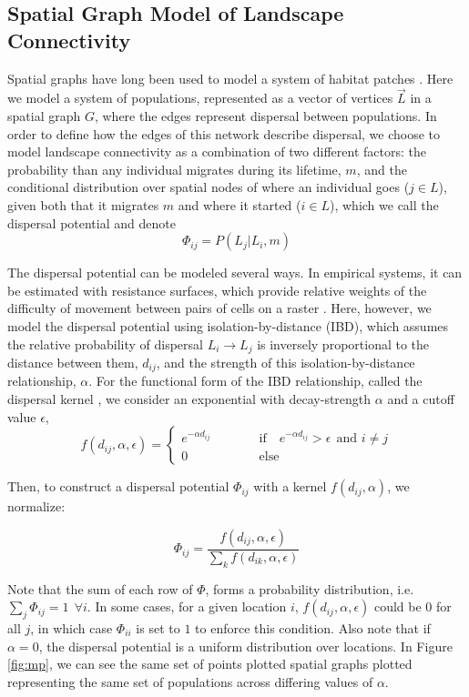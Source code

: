 \documentclass[]{article}
\begin{document}
\subsection{Spatial Graph Model of Landscape Connectivity}
Spatial graphs have long been used to model a system of habitat patches
\cite{dale_graphs_2010, minor_graph-theory_2008,
urban_landscape_2001}. 
Here we model a system of populations, represented as a vector of
vertices $\vec{L}$ in a spatial graph $G$, where the edges represent dispersal between populations. In order to define how the edges of this network describe dispersal, we choose to model landscape connectivity as a combination of two different factors: the probability than any individual migrates during its lifetime, $m$, and the conditional distribution over spatial nodes of where an individual goes ($j \in L$), given both that
it migrates $m$ and where it started ($i \in L$), which we call the dispersal potential and denote $$\Phi_{ij} =  P(L_j|L_i, m)$$

The dispersal potential can be modeled several ways. In empirical systems, it can be estimated with resistance surfaces, which provide
relative weights of the difficulty of movement between pairs of cells on a
raster \cite{spear_use_2010}. Here, however, we model
the dispersal potential using isolation-by-distance (IBD), which assumes the relative probability of dispersal $L_i \to L_j$ is inversely
proportional to the distance between them, \(d_{ij}\), and the strength
of this isolation-by-distance relationship, \(\alpha\). For the functional form of the IBD relationship, called the dispersal kernel \cite{grilli_metapopulation_2015, hanski_practical_1994}, we consider an exponential
with decay-strength $\alpha$ and a cutoff value $\epsilon$, 
$$f(d_{ij}, \alpha, \epsilon) =  \begin{cases}
        e^{-\alpha d_{ij}} \quad\quad\quad &\text{if}\quad e^{-\alpha d_{ij}} > \epsilon \ \ \text{and } i \neq j \\   0 &\text{else}
\end{cases}$$

Then, to construct a dispersal potential $\Phi_{ij}$ with a kernel $f(d_{ij}, \alpha)$,  we normalize:

$$\Phi_{ij} = \frac{f(d_{ij}, \alpha, \epsilon)}{\sum_k f(d_{ik},\alpha, \epsilon)}$$

Note that the sum of each row of $\Phi$, forms a probability distribution, i.e. $\sum_j \Phi_{ij} = 1 \ \ \forall i$. In some cases, for a given location $i$,  $f(d_{ij}, \alpha, \epsilon)$ could be $0$ for all $j$, in which case $\Phi_{ii}$ is set to $1$ to enforce this condition. Also note that if $\alpha=0$, the dispersal potential is a uniform distribution over locations. In Figure \ref{fig:mp}, we can see the same set of points plotted spatial graphs plotted representing the same set of populations across differing values of $\alpha$. 
\end{document}
